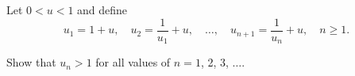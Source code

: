 Let $0 < u < 1$ and define\[u_1 = 1 + u, \quad u_2 = \frac{1}{u_1} + u, \quad \dots, \quad u_{n + 1} = \frac{1}{u_n} + u, \quad n \ge 1.\]

Show that $u_n > 1$ for all values of $n = 1$,  2, 3, $\dots$.